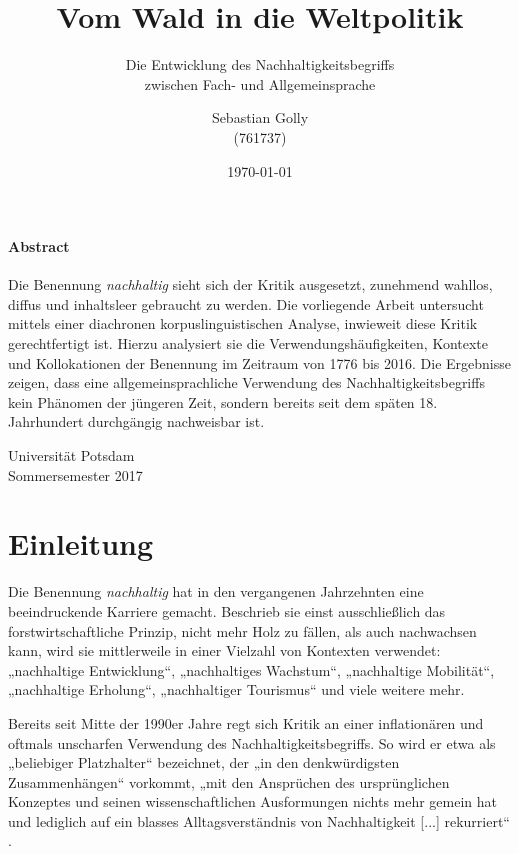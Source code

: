 \documentclass[
    german,
    a4paper,%
    12pt,%
    oneside,%
    toc=bibliography,
    final,
]{scrartcl}
\title{Vom Wald in die Weltpolitik}
\subtitle{Die Entwicklung des Nachhaltigkeitsbegriffs \\zwischen Fach- und Allgemeinsprache}
\author{Sebastian Golly\\ {\normalsize (761737)}}
\date{\today}
\begin{document}
\maketitle

\vfill

\paragraph{Abstract}

Die Benennung \textit{nachhaltig} sieht sich der Kritik ausgesetzt, zunehmend wahllos, diffus und inhaltsleer gebraucht zu werden. Die vorliegende Arbeit untersucht mittels einer diachronen korpuslinguistischen Analyse, inwieweit diese Kritik gerechtfertigt ist. Hierzu analysiert sie die Verwendungshäufigkeiten, Kontexte und Kollokationen der Benennung im Zeitraum von 1776 bis 2016. Die Ergebnisse zeigen, dass eine allgemeinsprachliche Verwendung des Nachhaltigkeitsbegriffs kein Phänomen der jüngeren Zeit, sondern bereits seit dem späten 18. Jahrhundert durchgängig nachweisbar ist.
\\[3em]

\vfill

\begin{center}
Universität Potsdam\\[1.5em]
Sommersemester 2017
\end{center}

\thispagestyle{empty}
\newpage


\section{Einleitung}
\label{sec:einleitung}

Die Benennung \textit{nachhaltig} hat in den vergangenen Jahrzehnten eine beeindruckende Karriere gemacht. Beschrieb sie einst ausschließlich das forstwirtschaftliche Prinzip, nicht mehr Holz zu fällen, als auch nachwachsen kann, wird sie mittlerweile in einer Vielzahl von Kontexten verwendet: „nachhaltige Entwicklung“, „nachhaltiges Wachstum“, „nachhaltige Mobilität“, „nachhaltige Erholung“, „nachhaltiger Tourismus“ und viele weitere mehr.

Bereits seit Mitte der 1990er Jahre regt sich Kritik an einer inflationären und oftmals unscharfen Verwendung des Nachhaltigkeitsbegriffs. So wird er etwa als „beliebiger Platzhalter“ \citep[141]{Vogel2011} bezeichnet, der „in den denkwürdigsten Zusammenhängen“ \citep[46]{Ninck1997} vorkommt, „mit den Ansprüchen des ursprünglichen Konzeptes und seinen wissenschaftlichen Ausformungen nichts mehr gemein hat und lediglich auf ein blasses Alltagsverständnis von Nachhaltigkeit [...] rekurriert“ \citep[5]{OhlmeierBrunold2015}.
\end{document}
